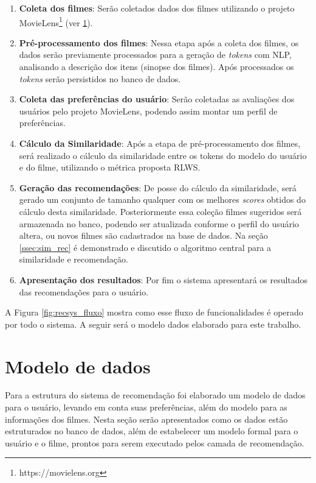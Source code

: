 \begin{enumerate}
	\item{\textbf{Coleta dos filmes}: Serão coletados dados dos filmes utilizando o projeto MovieLens\footnote{https://movielens.org} (ver \ref{sec:dataModel}).}
	
	\item{\textbf{Pré-processamento dos filmes}: Nessa etapa após a coleta dos filmes, os dados serão previamente processados para a geração de \textit{tokens} com \ac{NLP}, analisando a descrição dos itens (sinopse dos filmes). Após processados os \textit{tokens} serão persistidos no banco de dados.}
	
	\item{\textbf{Coleta das preferências do usuário}: Serão coletadas as avaliações dos usuários pelo projeto MovieLens, podendo assim montar um perfil de preferências.}

	\item{\textbf{Cálculo da Similaridade}: Após a etapa de pré-processamento dos filmes, será realizado o cálculo da similaridade entre os tokens do modelo do usuário e do filme, utilizando o métrica proposta \ac{RLWS}.}
	
	\item{\textbf{Geração das recomendações}: De posse do cálculo da similaridade, será gerado um conjunto de tamanho qualquer com os melhores \textit{scores} obtidos do cálculo desta similaridade. Posteriormente essa coleção filmes sugeridos será armazenada no banco, podendo ser atualizada conforme o perfil do usuário altera, ou novos filmes são cadastrados na base de dados. Na seção \ref{ssec:sim_rec} é demonstrado e discutido o algoritmo central para a similaridade e recomendação.}
	
	\item{\textbf{Apresentação dos resultados}: Por fim o sistema apresentará os resultados das recomendações para o usuário.}
\end{enumerate}

A Figura \ref{fig:recsys_fluxo} mostra como esse fluxo de funcionalidades é operado por todo o sistema. A seguir será o modelo dados elaborado para este trabalho.

\section{Modelo de dados}
\label{sec:dataModel}

Para a estrutura do sistema de recomendação foi elaborado um modelo de dados para o usuário, levando em conta suas preferências, além do modelo para as informações dos filmes. Nesta seção serão apresentados como os dados estão estruturados no banco de dados, além de estabelecer um modelo formal para o usuário e o filme, prontos para serem executado pelos camada de recomendação.

